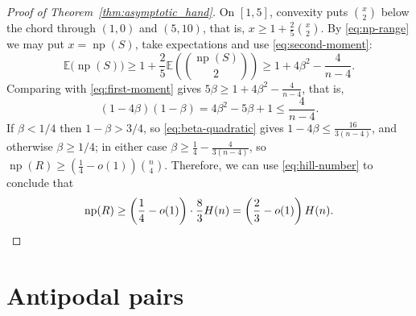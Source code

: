 \documentclass{article}
\theoremstyle{plain}
\theoremstyle{definition}
\theoremstyle{remark}
\newcommand{\np}{\operatorname{np}}
\begin{document}
\begin{proof}[Proof of Theorem~\ref{thm:asymptotic_hand}]
On \([1,5]\), convexity puts \(\binom x2\) below the chord through
\((1,0)\) and \((5,10)\), that is, \(x\geq1+\frac25\binom x2\).  By
\eqref{eq:np-range} we may put \(x=\np(S)\), take expectations and use
\eqref{eq:second-moment}:
\[
\mathbb E\bigl(\np(S)\bigr)
\geq1+\frac25\mathbb E\left(\binom{\np(S)}2\right)
\geq1+4\beta^2-\frac4{n-4} .
\]
Comparing with \eqref{eq:first-moment} gives
\(5\beta\geq1+4\beta^2-\frac4{n-4}\), that is,
\begin{equation}\label{eq:beta-quadratic}
(1-4\beta)(1-\beta)=4\beta^2-5\beta+1\leq\frac4{n-4} .
\end{equation}
If \(\beta<1/4\) then \(1-\beta>3/4\), so \eqref{eq:beta-quadratic}
gives \(1-4\beta\leq\frac{16}{3(n-4)}\), and otherwise
\(\beta\geq1/4\); in either case
\(\beta\geq\frac14-\frac4{3(n-4)}\), so
\(\np(R)\geq(\frac14-o(1))\binom n4\). Therefore, we can use \eqref{eq:hill-number} to conclude that
\[
\np(R)\geq\left(\frac14-o(1)\right)\cdot\frac83H(n)
=\left(\frac23-o(1)\right)H(n). \qedhere
\]
\end{proof}

\section{Antipodal pairs}\label{sec:antipodal}
\end{document}
